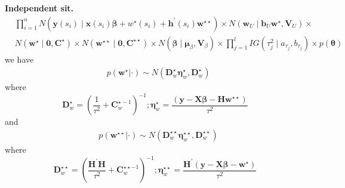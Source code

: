 \documentclass[
12pt, %
a4paper, %
oneside, %
headinclude,footinclude, %
BCOR5mm, %
]{scrartcl}
\begin{document}
\begin{itemize}
\begin{itemize}
\textbf{Independent sit.}
\begin{equation}
\begin{aligned}
& \prod_{i=1}^{n} N\left(\mathbf{y}\left({s}_{i}\right) \mid \mathbf{x}\left({s}_{i}\right) \boldsymbol{\beta}+
w^{\star}\left(s_i\right) + \mathbf{h}^\prime(s_i)\mathbf{w}^{\star\star}\right) \times N\left(\boldsymbol{w}_{U} \mid \mathbf{b}_{U}\mathbf{w}^{\star}, \boldsymbol{V}_{U}\right) \times \\ & 
N\left(\mathbf{w}^{\star} \mid \boldsymbol{0}, {\mathbf{C}}^{\star}\right) \times N\left(\mathbf{w}^{\star\star} \mid \boldsymbol{0}, {\mathbf{C}}^{\star\star}\right) \times N\left(\boldsymbol{\beta} \mid \boldsymbol{\mu}_{\beta}, \mathbf{V}_{\beta}\right) \times  \prod_{j=1}^{l} I G\left(\tau_{j}^{2} \mid a_{\tau_{j}}, b_{\tau_{j}}\right) \times p(\boldsymbol{\theta})
\end{aligned}
\end{equation}
we have 
\begin{equation}
\begin{aligned}
& p\left(\mathbf{w}^{\star}|\cdot\right) \sim N\left(\boldsymbol{D}^{\star}_w \boldsymbol{\eta}^{\star}_w, \boldsymbol{D}^{\star}_w\right)
\end{aligned}
\end{equation}
where 
\begin{equation*}
\boldsymbol{D}^{\star}_w=\left(\frac{1}{\tau^{2}}+\boldsymbol{C}_{w}^{\star -1}\right)^{-1} ; \boldsymbol{\eta}^{\star}_w = \frac{\left(\boldsymbol{y} - \boldsymbol{X}\boldsymbol{\beta} -  \boldsymbol{H}\boldsymbol{w}^{\star\star}\right)}{\tau^{2}} \label{Eq:gibbs_block_w1}
\end{equation*}
and
\begin{equation}
\begin{aligned}
& p\left(\mathbf{w}^{\star\star}|\cdot\right) \sim N\left(\boldsymbol{D}^{\star\star}_w \boldsymbol{\eta}^{\star\star}_w, \boldsymbol{D}^{\star\star}_w\right)
\end{aligned}
\end{equation}
where
\begin{equation*}
\boldsymbol{D}^{\star\star}_w=\left(\frac{\boldsymbol{H}^\prime\boldsymbol{H}}{\tau^{2}}+\boldsymbol{C}_{w}^{\star\star -1}\right)^{-1} ; \boldsymbol{\eta}^{\star\star}_w = \frac{\boldsymbol{H}^\prime\left(\boldsymbol{y} - \boldsymbol{X}\boldsymbol{\beta} - \boldsymbol{w}^{\star}\right)}{\tau^{2}} \label{Eq:gibbs_block_w2}
\end{equation*}



\end{itemize}
\end{itemize}
\end{document}
